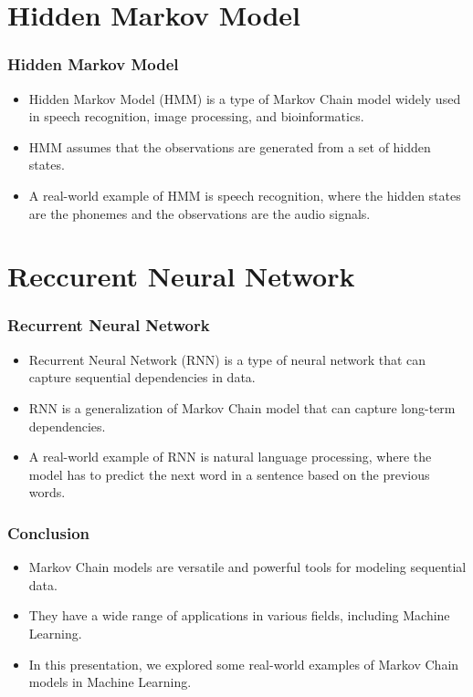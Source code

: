 \documentclass{beamer}
\begin{document}
\section{Hidden Markov Model}
	\begin{frame}
		\frametitle{Hidden Markov Model}
		\begin{itemize}
			\item Hidden Markov Model (HMM) is a type of Markov Chain model widely used in speech recognition, image processing, and bioinformatics.
			\item HMM assumes that the observations are generated from a set of hidden states.
			\item A real-world example of HMM is speech recognition, where the hidden states are the phonemes and the observations are the audio signals.
		\end{itemize}
	\end{frame}
	

	\section{Reccurent Neural Network}
	\begin{frame}
		\frametitle{Recurrent Neural Network}
		\begin{itemize}
			\item Recurrent Neural Network (RNN) is a type of neural network that can capture sequential dependencies in data.
			\item RNN is a generalization of Markov Chain model that can capture long-term dependencies.
			\item A real-world example of RNN is natural language processing, where the model has to predict the next word in a sentence based on the previous words.
		\end{itemize}
	\end{frame}
	
	\begin{frame}
		\frametitle{Conclusion}
		\begin{itemize}
			\item Markov Chain models are versatile and powerful tools for modeling sequential data.
			\item They have a wide range of applications in various fields, including Machine Learning.
			\item In this presentation, we explored some real-world examples of Markov Chain models in Machine Learning.
		\end{itemize}
	\end{frame}
	
\end{document}
